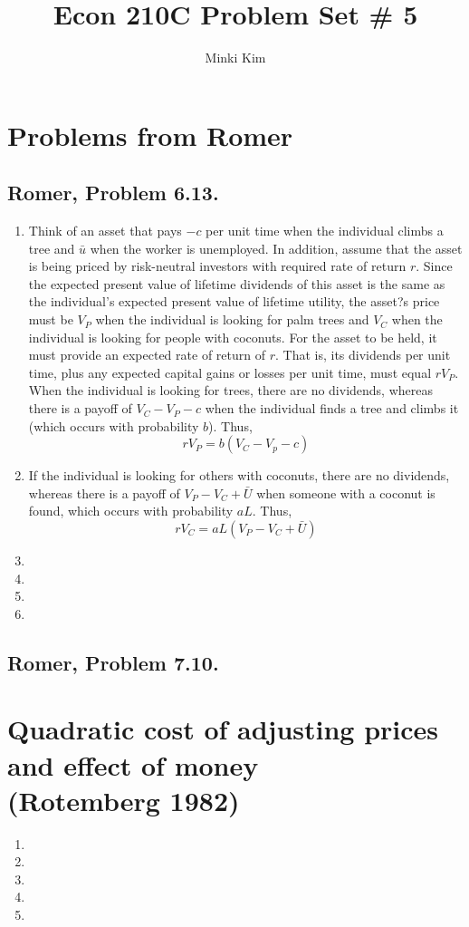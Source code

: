 \documentclass[11pt]{amsart}
\title{Econ 210C Problem Set \# 5}
\author{Minki Kim}
\begin{document}
\maketitle

\section{Problems from Romer}
\subsection{Romer, Problem 6.13.}
\begin{enumerate}[label = (\alph*)]
	\item Think of an asset that pays $-c$ per unit time when the individual climbs a tree and $\bar{u}$ when the worker is unemployed. 
	In addition, assume that the asset is being priced by risk-neutral investors with required rate of return $r$. 
	Since the expected present value of lifetime dividends of this asset is the same as the individual's expected present value of lifetime utility, the asset?s price must be $V_P$ when the individual is looking for palm trees and $V_C$ when the individual is looking for people with coconuts. 
	For the asset to be held, it must provide an expected rate of return of $r$. 
	That is, its dividends per unit time, plus any expected capital gains or losses per unit time, must equal $rV_P$.
	When the individual is looking for trees, there are no dividends, whereas there is a payoff of $V_C - V_P - c$ when the individual finds a tree and climbs it (which occurs with probability $b$). 
	Thus,
	\[
	r V_P = b(V_C - V_p - c)
	\]

	\item If the individual is looking for others with coconuts, there are no dividends, whereas there is a payoff of $V_P - V_C + \bar{U}$ when someone with a coconut is found, which occurs with probability $aL$.
	Thus,
	\[
	rV_C = a L (V_P - V_C + \bar{U})
	\]
	\item 
	\item 
	\item 
	\item
\end{enumerate}
\subsection{Romer, Problem 7.10.}
\section{Quadratic cost of adjusting prices and effect of money \\ (Rotemberg 1982)}
\begin{enumerate}[label = (\alph*)]
	\item 
	\item 
	\item 
	\item 
	\item
\end{enumerate}
\end{document}
